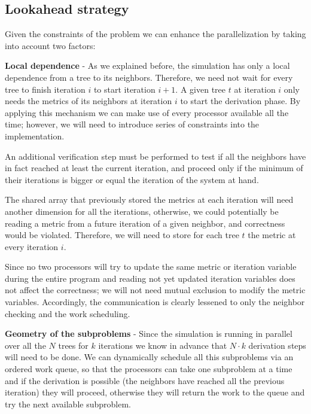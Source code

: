 \documentclass[letterpaper,twoside,11pt]{article}
\begin{document}
\begin{multicols}{2}

\subsection{Lookahead strategy} %
\label{sub:lookahead_startegy}

Given the constraints of the problem we can enhance the parallelization by taking into account two factors:

\textbf{Local dependence} - As we explained before, the simulation has only a local dependence from a tree to its neighbors. Therefore, we need not wait for every tree to finish iteration $i$ to start iteration $i+1$. A given tree $t$ at iteration $i$ only needs the metrics of its neighbors at iteration $i$ to start the derivation phase. By applying this mechanism we can make use of every processor available all the time; however, we will need to introduce series of constraints into the implementation.

An additional verification step must be performed to test if all the neighbors have in fact reached at least the current iteration, and proceed only if the minimum of their iterations is bigger or equal the iteration of the system at hand.

The shared array that previously stored the metrics at each iteration will need another dimension for all the iterations, otherwise, we could potentially be reading a metric from a future iteration of a given neighbor, and correctness would be violated. Therefore, we will need to store for each tree $t$ the metric at every iteration $i$.

Since no two processors will try to update the same metric or iteration variable during the entire program and reading not yet updated iteration variables does not affect the correctness; we will not need mutual exclusion to modify the metric variables. Accordingly, the communication is clearly lessened to only the neighbor checking and the work scheduling.

\textbf{Geometry of the subproblems} - Since the simulation is running in parallel over all the $N$ trees for $k$ iterations we know in advance that $N \cdot k $ derivation steps will need to be done. We can dynamically schedule all this subproblems via an ordered work queue, so that the processors can take one subproblem at a time and if the derivation is possible (the neighbors have reached all the previous iteration) they will proceed, otherwise they will return the work to the queue and try the next available subproblem.


\end{multicols}
\end{document}
